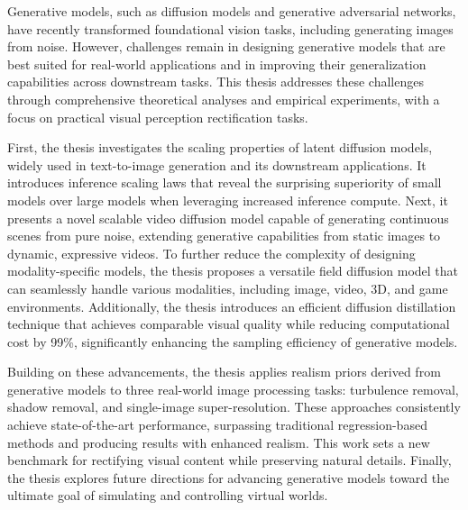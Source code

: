 

Generative models, such as diffusion models and generative adversarial networks, have recently transformed foundational vision tasks, including generating images from noise. However, challenges remain in designing generative models that are best suited for real-world applications and in improving their generalization capabilities across downstream tasks. This thesis addresses these challenges through comprehensive theoretical analyses and empirical experiments, with a focus on practical visual perception rectification tasks.

First, the thesis investigates the scaling properties of latent diffusion models, widely used in text-to-image generation and its downstream applications. It introduces inference scaling laws that reveal the surprising superiority of small models over large models when leveraging increased inference compute.
Next, it presents a novel scalable video diffusion model capable of generating continuous scenes from pure noise, extending generative capabilities from static images to dynamic, expressive videos. To further reduce the complexity of designing modality-specific models, the thesis proposes a versatile field diffusion model that can seamlessly handle various modalities, including image, video, 3D, and game environments.
Additionally, the thesis introduces an efficient diffusion distillation technique that achieves comparable visual quality while reducing computational cost by 99\%, significantly enhancing the sampling efficiency of generative models.

Building on these advancements, the thesis applies realism priors derived from generative models to three real-world image processing tasks: turbulence removal, shadow removal, and single-image super-resolution. These approaches consistently achieve state-of-the-art performance, surpassing traditional regression-based methods and producing results with enhanced realism. This work sets a new benchmark for rectifying visual content while preserving natural details.
Finally, the thesis explores future directions for advancing generative models toward the ultimate goal of simulating and controlling virtual worlds.



